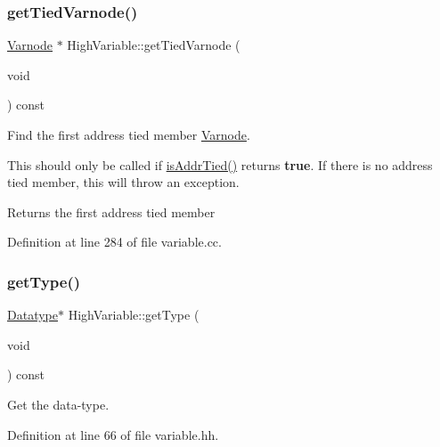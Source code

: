 \subsubsection{\texorpdfstring{getTiedVarnode()}{getTiedVarnode()}}
{\footnotesize\ttfamily \mbox{\hyperlink{class_varnode}{Varnode}} $\ast$ High\+Variable\+::get\+Tied\+Varnode (\begin{DoxyParamCaption}\item[{void}]{ }\end{DoxyParamCaption}) const}



Find the first address tied member \mbox{\hyperlink{class_varnode}{Varnode}}. 

This should only be called if \mbox{\hyperlink{class_high_variable_ab6344b0a90cd3b1f7371541ec0c77255}{is\+Addr\+Tied()}} returns {\bfseries{true}}. If there is no address tied member, this will throw an exception. \begin{DoxyReturn}{Returns}
the first address tied member 
\end{DoxyReturn}


Definition at line 284 of file variable.\+cc.

\mbox{\label{class_high_variable_ab6b69f8a3f3d5188308cd1ebbf0b0bac}} 
\subsubsection{\texorpdfstring{getType()}{getType()}}
{\footnotesize\ttfamily \mbox{\hyperlink{class_datatype}{Datatype}}$\ast$ High\+Variable\+::get\+Type (\begin{DoxyParamCaption}\item[{void}]{ }\end{DoxyParamCaption}) const\hspace{0.3cm}{\ttfamily [inline]}}



Get the data-\/type. 



Definition at line 66 of file variable.\+hh.

\mbox{\label{class_high_variable_a843fe881b588aa75432c3b2cc03146ec}} 
